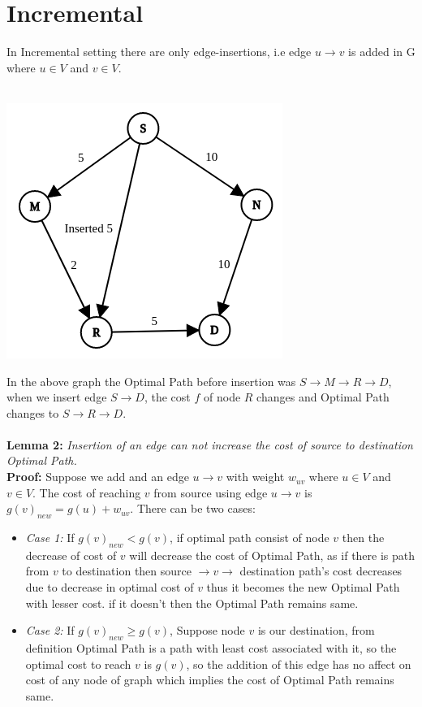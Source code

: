 \documentclass[a4paper]{article}
\begin{document}
\section{Incremental}
In Incremental setting there are only edge-insertions, i.e edge $u \rightarrow v $ is added in G where $u\in V $ and $v \in V$.\\
\\
\begin{center}
    \includegraphics[scale=0.4]{img/insert1.png}
\end{center}
In the above graph the Optimal Path before insertion was $S \rightarrow M \rightarrow R \rightarrow D$, when we insert edge $S \rightarrow D$, the cost $f$ of node $R$ changes and Optimal Path changes to $S \rightarrow R \rightarrow D$.\\
\\
\hypertarget{Lemma 2}{\textbf{Lemma 2:}} \textit{Insertion of an edge can not increase the cost of source to destination Optimal Path.}\\
\textbf{Proof:} Suppose we add and an edge $u \rightarrow v $ with weight $w_{uv}$ where $u \in V$ and $v \in V$. The cost of reaching $v$ from source using edge $u \rightarrow v$ is $g(v)_{new} = g(u) + w_{uv}$. There can be two cases:
\begin{itemize}[label={}]
    \item \textit{Case 1:} If $g(v)_{new} < g(v)$, if optimal path consist of node $v$ then the decrease of cost of $v$ will decrease the cost of Optimal Path, as if there is path from $v$ to destination then source $\rightarrow v \rightarrow$ destination path's cost decreases due to decrease in optimal cost of $v$ thus it becomes the new Optimal Path with lesser cost. if it doesn't then the Optimal Path remains same.
    
    \item \textit{Case 2:} If $g(v)_{new} \geq g(v)$,  Suppose node $v$ is our destination, from definition Optimal Path is a path with least cost associated with it, so the optimal cost to reach $v$ is $g(v)$, so the addition of this edge has no affect on cost of any node of graph which implies the cost of Optimal Path remains same.
\end{itemize}
\end{document}
